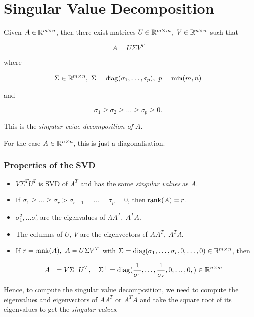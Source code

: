 \section{Singular Value Decomposition}

Given \(A \in \mathbb{R}^{m \times n}\), then there exist matrices \(U \in \R^{m \times m}, \ V \in \R^{n \times n}\) such that 

\[
    A = U \Sigma V^T
\]

where

\[
    \Sigma \in \mathbb{R}^{m \times n}, \ \Sigma = \mathrm{diag}(\sigma_1, \dots, \sigma_p), \ p = \min(m,n)
\]

and 

\[
    \sigma_1 \ge \sigma_2 \ge \dots \ge \sigma_p \ge 0.
\]

This is the \emph{singular value decomposition of \(A\)}. 

For the case \(A \in \mathbb{R}^{n \times n}\), this is just a diagonalisation.

\subsubsection*{Properties of the SVD}

\begin{itemize}

    \item \(V\Sigma^T U^T\) is SVD of \(A^T\) and has the same \emph{singular values} as \(A\).

    \item If \(\sigma_1 \ge \dots \ge \sigma_r > \sigma_{r + 1} = \dots  = \sigma_p = 0\), then \(\mathrm{rank}(A) = r\).

    \item \(\sigma_1^2, \dots \sigma_p^2\) are the eigenvalues of \(AA^T, \ A^TA\).

    \item The columns of \(U,\ V\) are the eigenvectors of \(AA^T, \ A^TA\).

    \item If \(r = \mathrm{rank}(A), \ A = U \Sigma V^T\) with \(\Sigma = \mathrm{diag}(\sigma_1, \dots, \sigma_r, 0, \dots, 0) \in \mathbb{R}^{m \times n}\), then
    
    \[
        A^+ = V \Sigma^+ U^T, \quad \Sigma^+ = \mathrm{diag}(\frac{1}{\sigma_1}, \dots, \frac{1}{\sigma_r}, 0, \dots, 0,) \in \mathbb{R}^{n \times m}
    \]

\end{itemize}

Hence, to compute the singular value decomposition, we need to compute the eigenvalues and eigenvectors of \(AA^T\) or \(A^TA\) and take the 
square root of its eigenvalues to get the \emph{singular values}.

